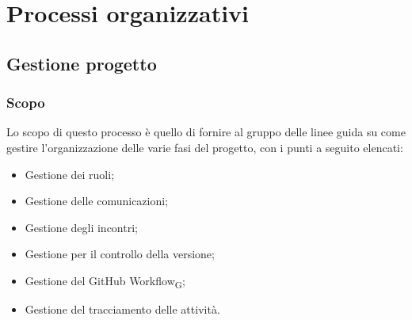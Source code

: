 \section{Processi organizzativi}
	\subsection{Gestione progetto}
	\subsubsection{Scopo}
	Lo scopo di questo processo è quello di fornire al gruppo delle linee guida su come gestire l'organizzazione delle varie fasi del progetto, con i punti a seguito elencati:
	\begin{itemize}
		\item Gestione dei ruoli;
		\item Gestione delle comunicazioni;
		\item Gestione degli incontri;
		\item Gestione per il controllo della versione;
		\item Gestione del GitHub Workflow\textsubscript{G};
		\item Gestione del tracciamento delle attività.
	\end{itemize}
